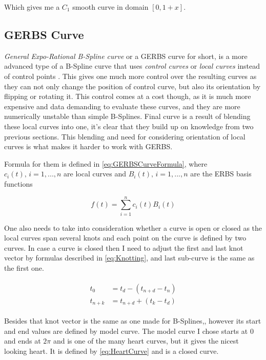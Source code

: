 \documentclass[a4paper,12pt]{extarticle}
\begin{document}
Which gives me a $C_1$ smooth curve in domain $[0,1+x]$.

\subsection{GERBS Curve}
\emph{General Expo-Rational B-Spline curve} or a GERBS curve for short, is a more advanced type of a B-Spline curve that uses \emph{control curves} or \emph{local curves} instead of control points . This gives one much more control over the resulting curves as they can not only change the position of control curve, but also its orientation by flipping or rotating it. This control comes at a cost though, as it is much more expensive and data demanding to evaluate these curves, and they are more numerically unstable than simple B-Splines. Final curve is a result of blending these local curves into one, it's clear that they build up on knowledge from two previous sections. This blending and need for considering orientation of local curves is what makes it harder to work with GERBS.

Formula for them is defined in \cref{eq:GERBSCurveFormula}, where $c_i(t), \, i=1,..., n$ are local curves and $B_i(t), \, i=1,..., n$ are the ERBS basis functions

\begin{equation}
f(t)= \sum_{i=1}^{n} c_i(t) B_i(t)
\label{eq:GERBSCurveFormula}
\end{equation}

One also needs to take into consideration whether a curve is open or closed as the local curves span several knots and each point on the curve is defined by two curves. In case a curve is closed then I need to adjust the first and last knot vector by formulas described in \cref{eq:Knotting}, and last sub-curve is the same as the first one.

\begin{align}
\begin{split}
t_0&=t_d-(t_{n+d}-t_n)\\
t_{n+k}&=t_{n+d}+(t_k-t_d)
\label{eq:Knotting}
\end{split}
\end{align}

Besides that knot vector is the same as one made for B-Splines,, however its start and end values are defined by model curve. The model curve I chose starts at $0$ and ends at $2\pi$ and is one of the many heart curves, but it gives the nicest looking heart. It is defined by \cref{eq:HeartCurve} \citep{Weisstein2018} and is a closed curve.
\end{document}
